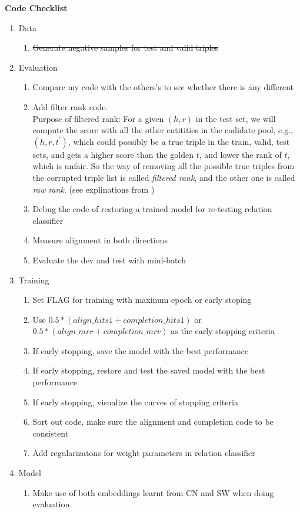 \textbf{Code Checklist}
\begin{enumerate}
    \item Data
        \begin{enumerate}
            \item \sout{Generate negative samples for test and valid triples}
        \end{enumerate}
    \item  Evaluation 
        \begin{enumerate}
            \item  Compare my code with the others's to see whether there is any different
             \item  \faCheckSquareO Add filter rank code. \\ Purpose of filtered rank: For a given $(h,r)$ in the test set, we will compute the score with all the other entitities in the cadidate pool, e.g., $(h,r,t^{\prime})$, which could possibly be a true triple in the train, valid, test sets, and gets a higher score than the golden $t$, and lower the rank of $t$, which is unfair. So the way of removing  all the possible true triples from the corrupted triple list is called \textit{filtered rank}, and the other one is called \textit{raw rank}.  (see explinations from \cite{Bordes2013TransENIPS,Dettmers2018conve})
            \item \faCheckSquareO Debug the code of restoring a trained model for re-testing relation classifier
            \item  \faCheckSquareO Measure alignment in both directions 
            \item Evaluate the dev and test with mini-batch
        \end{enumerate}
    \item  Training
        \begin{enumerate}
            \item \faCheckSquareO Set FLAG for training with maxinum epoch or early stoping 
            \item \faCheckSquareO Use $0.5*(align\_hits1 + completion\_hits1)$ or $0.5*(align\_mrr + completion\_mrr)$ as the early stopping criteria 
            \item \faCheckSquareO If early stopping, save the model with the best performance
            \item If early stopping, restore and test the saved model with the best performance
            \item If early stopping, visualize the curves of stopping criteria
            \item Sort out code, make sure the alignment and completion code to be consistent
            \item Add regularizatons for weight parameters in relation classifier
        \end{enumerate}
    \item  Model
        \begin{enumerate}
            \item Make use of both embeddings learnt from CN and SW when doing evaluation. 
        \end{enumerate}
\end{enumerate}





